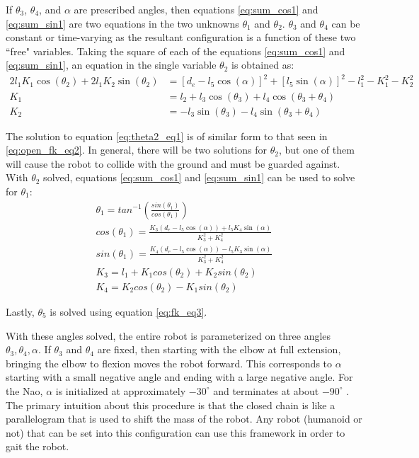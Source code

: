 If $\theta_3$, $\theta_4$, and $\alpha$ are prescribed angles, then equations \ref{eq:sum_cos1} and \ref{eq:sum_sin1} are two equations 
in the two unknowns $\theta_1$ and $\theta_2$. 
$\theta_3$ and $\theta_4$ can be constant or time-varying as the resultant configuration is a function of these two ``free" variables.
Taking the square of each of the equations \ref{eq:sum_cos1} and \ref{eq:sum_sin1}, 
an equation in the single variable $\theta_2$ is obtained as:
\begin{align}
	2l_1 K_1 \cos(\theta_2) + 2l_1K_2 \sin(\theta_2) &= [d_e - l_5 \cos(\alpha)]^2 + [l_5 \sin(\alpha)]^2 - l_1^2 - K_1^2 - K_2^2 \label{eq:theta2_eq1} \\
	K_1 &= l_2 + l_3 \cos(\theta_3) + l_4 \cos(\theta_3 + \theta_4) \label{eq:theta2_eq2}\\
	K_2 &= -l_3 \sin(\theta_3) - l_4 \sin(\theta_3 + \theta_4) \label{eq:theta2_eq3}
\end{align}

The solution to equation \ref{eq:theta2_eq1} is of similar form to that seen in \ref{eq:open_fk_eq2}.
In general, there will be two solutions for $\theta_2$, but one of them will cause the robot to collide
with the ground and must be guarded against.
With $\theta_2$ solved, equations \ref{eq:sum_cos1} and \ref{eq:sum_sin1} can be used to solve for $\theta_1$:
\begin{align}
	\theta_1 = tan^{-1} \left( \frac{sin(\theta_1)}{cos(\theta_1)} \right ) \label{eq:theta1_eq1}\\
	cos(\theta_1) = \frac{K_3 (d_e - l_5 \cos(\alpha)) + l_5 K_4 \sin(\alpha)}{K_3^2 + K_4^2} \label{eq:theta1_eq2}\\
	sin(\theta_1) = \frac{K_4 (d_e - l_5 \cos(\alpha)) - l_5 K_3 \sin(\alpha)}{K_3^2 + K_4^2} \label{eq:theta1_eq3}\\
	K_3 = l_1 + K_1 cos(\theta_2) + K_2 sin(\theta_2) \label{eq:theta1_eq4}\\
	K_4 = K_2 cos(\theta_2) - K_1 sin(\theta_2) \label{eq:theta1_eq5}
\end{align}

Lastly, $\theta_5$ is solved using equation \ref{eq:fk_eq3}.

With these angles solved, the entire robot is parameterized on three angles $\theta_3, \theta_4, \alpha$.
If $\theta_3$ and $\theta_4$ are fixed, then starting with the elbow at full extension, bringing the elbow
to flexion moves the robot forward. This corresponds to $\alpha$ starting with a small negative angle and 
ending with a large negative angle. 
For the Nao, $\alpha$ is initialized at approximately $-30^\circ$ and terminates at about $-90^\circ$ .
The primary intuition about this procedure is that the closed chain is like a parallelogram that is used to shift
the mass of the robot. Any robot (humanoid or not) that can be set into this configuration can use this 
framework in order to gait the robot.

